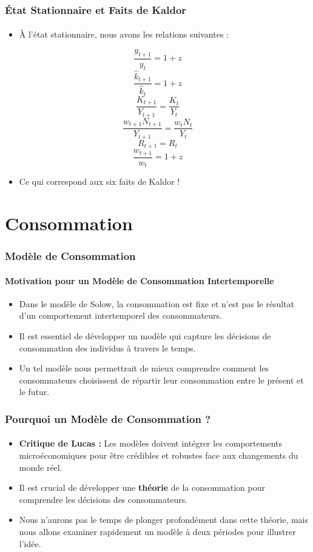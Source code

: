 \documentclass{beamer}
\begin{document}
\begin{frame}
    \frametitle{État Stationnaire et Faits de Kaldor}
    \framesubtitle{}

    \begin{itemize}
        \item À l'état stationnaire, nous avons les relations suivantes :
    \end{itemize}

    \[
    \frac{y_{t+1}}{y_t} = 1 + z
    \]
    \[
    \frac{\hat{k}_{t+1}}{\hat{k}_t} = 1 + z
    \]
    \[
    \frac{K_{t+1}}{Y_{t+1}} = \frac{K_t}{Y_t}
    \]
    \[
    \frac{w_{t+1} N_{t+1}}{Y_{t+1}} = \frac{w_t N_t}{Y_t}
    \]
    \[
    R_{t+1} = R_t
    \]
    \[
    \frac{w_{t+1}}{w_t} = 1 + z
    \]

    \begin{itemize}
        \item Ce qui correspond aux six faits de Kaldor !
    \end{itemize}
\end{frame}

\section*{Consommation }

\begin{frame}
    \frametitle{Modèle de Consommation }
    \framesubtitle{Motivation pour un Modèle de Consommation Intertemporelle}

    \begin{itemize}
        \item Dans le modèle de Solow, la consommation est fixe et n'est pas le résultat d'un 
        comportement intertemporel des consommateurs.
        \pause
        \item Il est essentiel de développer un modèle qui capture les décisions de consommation 
        des individus à travers le temps.
        \pause
        \item Un tel modèle nous permettrait de mieux comprendre comment les consommateurs choisissent 
        de répartir leur consommation entre le présent et le futur.
    \end{itemize}
\end{frame}
\begin{frame}
    \frametitle{Pourquoi un Modèle de Consommation ?}
    \framesubtitle{}

    \begin{itemize}
        \item \textbf{Critique de Lucas :} Les modèles doivent intégrer les comportements microéconomiques 
        pour être crédibles et robustes face aux changements du monde réel.
        \pause
        \item Il est crucial de développer une \textbf{théorie} de la consommation pour comprendre les 
        décisions des consommateurs.
        \pause
        \item Nous n'aurons pas le temps de plonger profondément dans cette théorie, mais nous allons examiner 
        rapidement un modèle à deux périodes pour illustrer l'idée.
    \end{itemize}
\end{frame}
\end{document}
